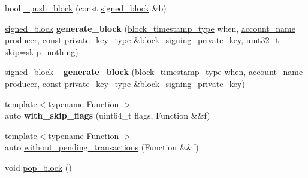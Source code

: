 \begin{DoxyCompactItemize}
\item 
bool \mbox{\hyperlink{classaacio_1_1chain_1_1chain__controller_a03b5b87487b63dba3295f4b802053380}{\+\_\+push\+\_\+block}} (const \mbox{\hyperlink{structaacio_1_1chain_1_1signed__block}{signed\+\_\+block}} \&b)
\item 
\mbox{\label{classaacio_1_1chain_1_1chain__controller_abc6e65db8cc1dc2169dcd2f690d3f00c}} 
\mbox{\hyperlink{structaacio_1_1chain_1_1signed__block}{signed\+\_\+block}} {\bfseries generate\+\_\+block} (\mbox{\hyperlink{classaacio_1_1chain_1_1block__timestamp}{block\+\_\+timestamp\+\_\+type}} when, \mbox{\hyperlink{structaacio_1_1chain_1_1name}{account\+\_\+name}} producer, const \mbox{\hyperlink{classfc_1_1crypto_1_1private__key}{private\+\_\+key\+\_\+type}} \&block\+\_\+signing\+\_\+private\+\_\+key, uint32\+\_\+t skip=skip\+\_\+nothing)
\item 
\mbox{\label{classaacio_1_1chain_1_1chain__controller_afd78a7ef39a8dfeedaad2bb13aa767d1}} 
\mbox{\hyperlink{structaacio_1_1chain_1_1signed__block}{signed\+\_\+block}} {\bfseries \+\_\+generate\+\_\+block} (\mbox{\hyperlink{classaacio_1_1chain_1_1block__timestamp}{block\+\_\+timestamp\+\_\+type}} when, \mbox{\hyperlink{structaacio_1_1chain_1_1name}{account\+\_\+name}} producer, const \mbox{\hyperlink{classfc_1_1crypto_1_1private__key}{private\+\_\+key\+\_\+type}} \&block\+\_\+signing\+\_\+private\+\_\+key)
\item 
\mbox{\label{classaacio_1_1chain_1_1chain__controller_aa24ab0e5b12e94aec7cb94ea30090431}} 
{\footnotesize template$<$typename Function $>$ }\\auto {\bfseries with\+\_\+skip\+\_\+flags} (uint64\+\_\+t flags, Function \&\&f)
\item 
{\footnotesize template$<$typename Function $>$ }\\auto \mbox{\hyperlink{classaacio_1_1chain_1_1chain__controller_a442beb698ea61031638b7cbae7fca7c6}{without\+\_\+pending\+\_\+transactions}} (Function \&\&f)
\item 
void \mbox{\hyperlink{classaacio_1_1chain_1_1chain__controller_a58bf5d32ed81ff6aa8024ec8fa1ee105}{pop\+\_\+block}} ()
\item 
\mbox{\label{classaacio_1_1chain_1_1chain__controller_a756da74d195f373ebf133d94cd58ac21}} 

\end{DoxyCompactItemize}
